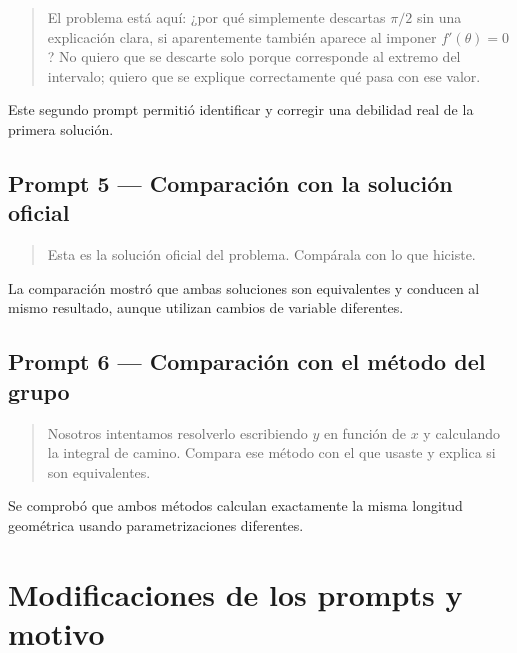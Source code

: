 \begin{quote}
El problema está aquí: ¿por qué simplemente descartas \(\pi/2\) sin una explicación clara, si aparentemente también aparece al imponer \(f'(\theta)=0\)? No quiero que se descarte solo porque corresponde al extremo del intervalo; quiero que se explique correctamente qué pasa con ese valor.
\end{quote}

Este segundo prompt permitió identificar y corregir una debilidad real de la primera solución.

\subsection*{Prompt 5 --- Comparación con la solución oficial}

\begin{quote}
Esta es la solución oficial del problema. Compárala con lo que hiciste.
\end{quote}

La comparación mostró que ambas soluciones son equivalentes y conducen al mismo resultado, aunque utilizan cambios de variable diferentes.

\subsection*{Prompt 6 --- Comparación con el método del grupo}

\begin{quote}
Nosotros intentamos resolverlo escribiendo \(y\) en función de \(x\) y calculando la integral de camino. Compara ese método con el que usaste y explica si son equivalentes.
\end{quote}

Se comprobó que ambos métodos calculan exactamente la misma longitud geométrica usando parametrizaciones diferentes.

\section{Modificaciones de los prompts y motivo}

